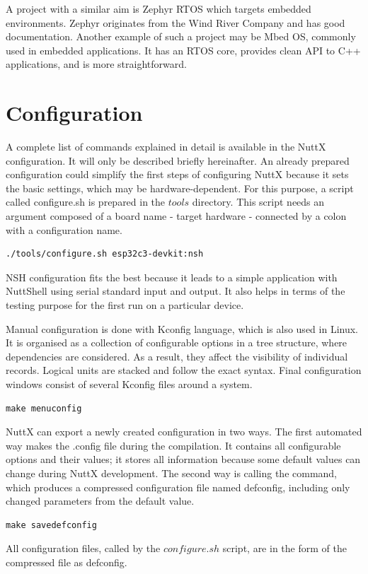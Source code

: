 \documentclass{ctuthesis}
\begin{document}
  \quad A project with a similar aim is Zephyr RTOS which targets embedded environments. Zephyr originates from the Wind River Company and has good documentation\cite{zephyr}. Another example of such a project may be Mbed OS, commonly used in embedded applications. It has an RTOS core, provides clean API to C++ applications, and is more straightforward\cite{mbed}.

 \section{Configuration}
  A complete list of commands explained in detail is available in the NuttX configuration\cite{nuttx_start}. It will only be described briefly hereinafter. An already prepared configuration could simplify the first steps of configuring NuttX because it sets the basic settings, which may be hardware-dependent. For this purpose, a script called configure.sh is prepared in the $tools$ directory. This script needs an argument composed of a board name - target hardware - connected by a colon with a configuration name.
\begin{verbatim}
./tools/configure.sh esp32c3-devkit:nsh
\end{verbatim}
 NSH configuration fits the best because it leads to a simple application with NuttShell using serial standard input and output. It also helps in terms of the testing purpose for the first run on a particular device.  \newline
  
  \quad Manual configuration is done with Kconfig language, which is also used in Linux. It is organised as a collection of configurable options in a tree structure, where dependencies are considered. As a result, they affect the visibility of individual records. Logical units are stacked and follow the exact syntax. Final configuration windows consist of several Kconfig files around a system\cite{kconfig}.
\begin{verbatim}
make menuconfig
\end{verbatim}
 NuttX can export a newly created configuration in two ways. The first automated way makes the .config file during the compilation. It contains all configurable options and their values; it stores all information because some default values can change during NuttX development. The second way is calling the command, which produces a compressed configuration file named defconfig, including only changed parameters from the default value.
\begin{verbatim}
make savedefconfig
\end{verbatim}
 All configuration files, called by the $configure.sh$ script, are in the form of the compressed file as defconfig.
\end{document}
